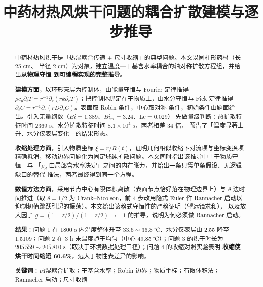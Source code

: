 \documentclass[withoutpreface,bwprint]{cumcmthesis}
\title{中药材热风烘干问题的耦合扩散建模与逐步推导}
\begin{document}
\maketitle
\begin{abstract}

中药材热风烘干是「热湿耦合传递 + 尺寸收缩」的典型问题。本文以圆柱形药材（长 25 cm、
半径 2 cm）为对象，建立温度—干基含水率耦合的轴对称扩散方程组，并给出\textbf{从物理守恒
到可编程实现的完整推导}。

\textbf{建模方面}，以环形壳层为控制体，由能量守恒与 Fourier 定律推得
$\rho c_p\partial_tT=r^{-1}\partial_r(rk\partial_rT)$；把控制体绑定在干物质上，由水分守恒与
Fick 定律推得 $\partial_tC=r^{-1}\partial_r(rD\partial_rC)$。表面取 Robin 条件，中心取对称
条件，初始条件由题面给出。引入无量纲数（$Bi=1.389$、$Bi_m=3.24$、$\mathrm{Le}=0.029$）
先做量级判断：热扩散特征时间 2369 s、水分扩散特征时间 $8.1\times10^4$ s，两者相差 34 倍，
预告了「温度显著上升、水分仅表层变化」的结果形态。

\textbf{收缩处理方面}，引入物质坐标 $\xi=r/R(t)$，证明几何相似收缩下对流项与坐标变换项
精确抵消，移动边界问题化为固定域纯扩散问题。本文同时指出该推导中「干物质守恒」与
「$\rho_d$ 由局部含水率决定」之间的内在张力，并给出一条只需单条假设、无逻辑缺口的替代
推法，两者最终得到同一个方程。

\textbf{数值方法方面}，采用节点中心有限体积离散（表面节点恰好落在物理边界上）与
$\theta$ 法时间推进（取 $\theta=1/2$ 为 Crank--Nicolson，前 4 步改用隐式 Euler 作
Rannacher 启动以抑制初值跳跃引起的振荡）。本文给出该格式守恒性的严格证明（望远镜求和），
以及放大因子 $g=(1+z/2)/(1-z/2)\to-1$ 的推导，说明为何必须做 Rannacher 启动。

\textbf{结果}：问题 1 在 1800 s 内温度整体升至 $33.6\sim36.8$ ℃、水分仅表层由 2.55 降至
1.5109；问题 2 在 3 h 末温度趋于均匀（中心 49.85 ℃）；问题 3 的烘干时长为
$205\,559\sim205\,810$ s（取决于环境数据处理口径）；问题 4 的收缩对照实验表明
\textbf{收缩使烘干时间缩短 60.6\%}，远大于物性表差异的影响。

\textbf{关键词}：热湿耦合扩散；干基含水率；Robin 边界；物质坐标；有限体积法；
Rannacher 启动；尺寸收缩

\end{abstract}

\end{document}
